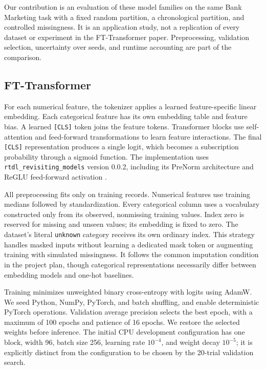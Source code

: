 Our contribution is an evaluation of these model families on the same Bank
Marketing task with a fixed random partition, a chronological partition, and
controlled missingness. It is an application study, not a replication of every
dataset or experiment in the FT-Transformer paper. Preprocessing, validation
selection, uncertainty over seeds, and runtime accounting are part of the
comparison.

\subsection{FT-Transformer}
For each numerical feature, the tokenizer applies a learned feature-specific
linear embedding. Each categorical feature has its own embedding table and feature
bias. A learned \texttt{[CLS]} token joins the feature tokens. Transformer blocks
use self-attention and feed-forward transformations to learn feature interactions.
The final \texttt{[CLS]} representation produces a single logit, which becomes a
subscription probability through a sigmoid function. The implementation uses
\texttt{rtdl\_revisiting\_models} version 0.0.2, including its PreNorm architecture
and ReGLU feed-forward activation \cite{rtdlcode}.

All preprocessing fits only on training records. Numerical features use training
medians followed by standardization. Every categorical column uses a vocabulary
constructed only from its observed, nonmissing training values. Index zero is
reserved for missing and unseen values; its embedding is fixed to zero. The
dataset's literal \texttt{unknown} category receives its own ordinary index.
This strategy handles masked inputs without learning a dedicated mask token or
augmenting training with simulated missingness. It follows the common imputation
condition in the project plan, though categorical representations necessarily
differ between embedding models and one-hot baselines.

Training minimizes unweighted binary cross-entropy with logits using AdamW. We
seed Python, NumPy, PyTorch, and batch shuffling, and enable deterministic PyTorch
operations. Validation average precision selects the best epoch, with a maximum
of 100 epochs and patience of 16 epochs. We restore the selected weights before
inference. The initial CPU development configuration has one block, width 96,
batch size 256, learning rate $10^{-4}$, and weight decay $10^{-5}$; it is explicitly
distinct from the configuration to be chosen by the 20-trial validation search.

